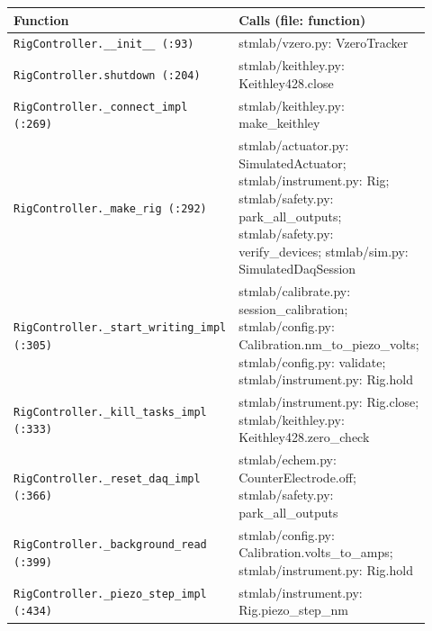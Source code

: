 \small\setlength{\LTleft}{0pt}\setlength{\LTright}{\fill}
\begin{longtable}{@{}>{\raggedright\arraybackslash}p{0.280\linewidth}>{\raggedright\arraybackslash}p{0.640\linewidth}@{}}
\toprule
\textbf{Function} & \textbf{Calls (file: function)} \\
\midrule\endhead
\texttt{Rig\discretionary{}{}{}Controller.\discretionary{}{}{}\_\discretionary{}{}{}\_\discretionary{}{}{}init\_\discretionary{}{}{}\_\discretionary{}{}{} (:93)} & stmlab/vzero.py: VzeroTracker \\
\texttt{Rig\discretionary{}{}{}Controller.\discretionary{}{}{}shutdown (:204)} & stmlab/keithley.py: Keithley428.close \\
\texttt{Rig\discretionary{}{}{}Controller.\discretionary{}{}{}\_\discretionary{}{}{}connect\_\discretionary{}{}{}impl (:269)} & stmlab/keithley.py: make\_keithley \\
\texttt{Rig\discretionary{}{}{}Controller.\discretionary{}{}{}\_\discretionary{}{}{}make\_\discretionary{}{}{}rig (:292)} & stmlab/actuator.py: SimulatedActuator; stmlab/instrument.py: Rig; stmlab/safety.py: park\_all\_outputs; stmlab/safety.py: verify\_devices; stmlab/sim.py: SimulatedDaqSession \\
\texttt{Rig\discretionary{}{}{}Controller.\discretionary{}{}{}\_\discretionary{}{}{}start\_\discretionary{}{}{}writing\_\discretionary{}{}{}impl (:305)} & stmlab/calibrate.py: session\_calibration; stmlab/config.py: Calibration.nm\_to\_piezo\_volts; stmlab/config.py: validate; stmlab/instrument.py: Rig.hold \\
\texttt{Rig\discretionary{}{}{}Controller.\discretionary{}{}{}\_\discretionary{}{}{}kill\_\discretionary{}{}{}tasks\_\discretionary{}{}{}impl (:333)} & stmlab/instrument.py: Rig.close; stmlab/keithley.py: Keithley428.zero\_check \\
\texttt{Rig\discretionary{}{}{}Controller.\discretionary{}{}{}\_\discretionary{}{}{}reset\_\discretionary{}{}{}daq\_\discretionary{}{}{}impl (:366)} & stmlab/echem.py: CounterElectrode.off; stmlab/safety.py: park\_all\_outputs \\
\texttt{Rig\discretionary{}{}{}Controller.\discretionary{}{}{}\_\discretionary{}{}{}background\_\discretionary{}{}{}read (:399)} & stmlab/config.py: Calibration.volts\_to\_amps; stmlab/instrument.py: Rig.hold \\
\texttt{Rig\discretionary{}{}{}Controller.\discretionary{}{}{}\_\discretionary{}{}{}piezo\_\discretionary{}{}{}step\_\discretionary{}{}{}impl (:434)} & stmlab/instrument.py: Rig.piezo\_step\_nm \\

\end{longtable}
